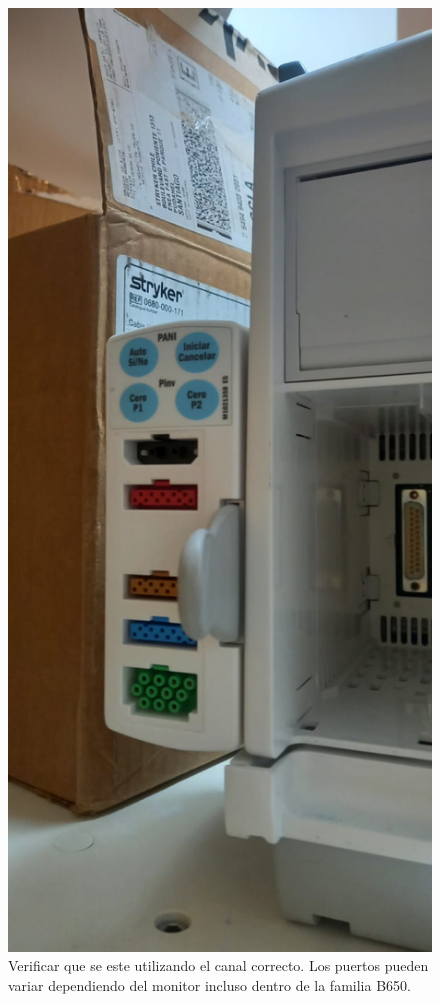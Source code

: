 \documentclass{article}
\begin{document}
\begin{figure}[h]
	\centering
	\includegraphics[scale=0.2]{img/canal.png}
	\caption{Verificar que se este utilizando el canal correcto. Los puertos pueden variar dependiendo del monitor incluso dentro de la familia B650.}
	\label{fig:canal}
\end{figure}
\end{document}
